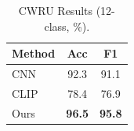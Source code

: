 \begin{table}[htbp]
\centering
\caption{CWRU Results (12-class, \%).}
\label{tab:IV}
\begin{tabular}{@{}lcc@{}}
\toprule
Method & Acc & F1 \\
\midrule
CNN & 92.3 & 91.1 \\
CLIP & 78.4 & 76.9 \\
Ours & \textbf{96.5} & \textbf{95.8} \\
\bottomrule
\end{tabular}
\end{table}

